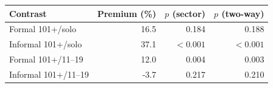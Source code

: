 \begin{tabular}{lrrr}
\toprule
Contrast & Premium (\%) & $p$ (sector) & $p$ (two-way) \\
\midrule
Formal 101+/solo & 16.5 & 0.184 & 0.188 \\
Informal 101+/solo & 37.1 & $<0.001$ & $<0.001$ \\
Formal 101+/11--19 & 12.0 & 0.004 & 0.003 \\
Informal 101+/11--19 & -3.7 & 0.217 & 0.210 \\
\bottomrule\end{tabular}
